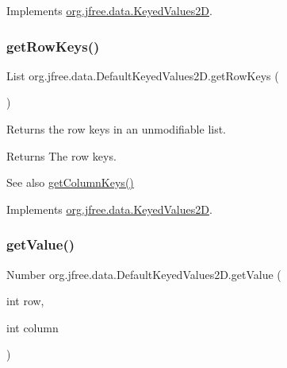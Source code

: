 Implements \mbox{\hyperlink{interfaceorg_1_1jfree_1_1data_1_1_keyed_values2_d_a7c145e2383036a479460e4bca7b40a95}{org.\+jfree.\+data.\+Keyed\+Values2D}}.

\mbox{\label{classorg_1_1jfree_1_1data_1_1_default_keyed_values2_d_a5def878586be4fbe2c3bc7750eaac41b}} 
\subsubsection{\texorpdfstring{get\+Row\+Keys()}{getRowKeys()}}
{\footnotesize\ttfamily List org.\+jfree.\+data.\+Default\+Keyed\+Values2\+D.\+get\+Row\+Keys (\begin{DoxyParamCaption}{ }\end{DoxyParamCaption})}

Returns the row keys in an unmodifiable list.

\begin{DoxyReturn}{Returns}
The row keys.
\end{DoxyReturn}
\begin{DoxySeeAlso}{See also}
\mbox{\hyperlink{classorg_1_1jfree_1_1data_1_1_default_keyed_values2_d_ae390bd83ecd242c0e90eee1d8adede7a}{get\+Column\+Keys()}} 
\end{DoxySeeAlso}


Implements \mbox{\hyperlink{interfaceorg_1_1jfree_1_1data_1_1_keyed_values2_d_aeda9aab284e61f69ca6e81370e76f70a}{org.\+jfree.\+data.\+Keyed\+Values2D}}.

\mbox{\label{classorg_1_1jfree_1_1data_1_1_default_keyed_values2_d_a41bc5c5a2d789f49b7cf210a13f37a5a}} 
\subsubsection{\texorpdfstring{get\+Value()}{getValue()}\hspace{0.1cm}{\footnotesize\ttfamily [1/2]}}
{\footnotesize\ttfamily Number org.\+jfree.\+data.\+Default\+Keyed\+Values2\+D.\+get\+Value (\begin{DoxyParamCaption}\item[{int}]{row,  }\item[{int}]{column }\end{DoxyParamCaption})}

